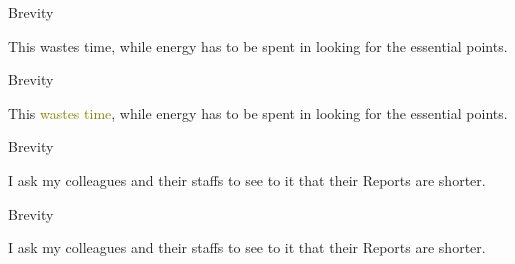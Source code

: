 \documentclass[
  ignorenonframetext,
]{beamer}
\begin{document}
\begin{frame}{Brevity}
\protect\hypertarget{brevity-3}{}
\Large

This wastes time, while energy has to be spent in looking for the
essential points.

\par

\vfill\Huge


\vfill

\mbox{}
\end{frame}

\begin{frame}{Brevity}
\protect\hypertarget{brevity-4}{}
\Large

This \textcolor{olive}{wastes time}, while energy has to be spent in
looking for \textcolor{softblue}{the essential points}.

\par

\vfill\Huge


\vfill
\end{frame}

\begin{frame}{Brevity}
\protect\hypertarget{brevity-5}{}
\Large

I ask my colleagues and their staffs to see to it that their Reports are
shorter.

\vfill\Huge


\vfill
\end{frame}

\begin{frame}{Brevity}
\protect\hypertarget{brevity-6}{}
\Large

I ask my colleagues and their staffs to see to it that
\textcolor{softblue}{their Reports are shorter}.

\vfill\Huge


\vfill
\end{frame}
\end{document}
